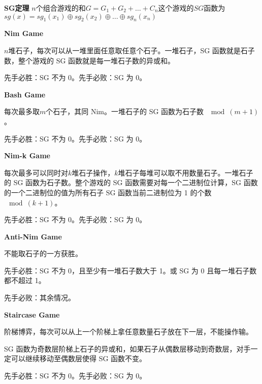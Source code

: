 \textbf{SG定理} $n$个组合游戏的和$G=G_1+G_2+\dots + C_n$这个游戏的$SG$函数为$sg(x) = sg_1(x_1) \oplus sg_2(x_2) \oplus \dots \oplus sg_n(x_n)$

\textbf{Nim Game}

$n$堆石子，每次可以从一堆里面任意取任意个石子。一堆石子，SG 函数就是石子数，整个游戏的 SG 函数就是每一堆石子数的异或和。

先手必胜：SG 不为 0。先手必败：SG 为 0。

\textbf{Bash Game}

每次最多取$m$个石子，其同 Nim。一堆石子的 SG 函数为石子数 $\mod(m + 1)$。

先手必胜：SG 不为 0。先手必败：SG 为 0。

\textbf{Nim-k Game}

每次最多可以同时对$k$堆石子操作，$k$堆石子每堆可以取不用数量石子。一堆石子的 SG 函数为石子数。整个游戏的 SG 函数需要对每一个二进制位计算，SG 函数的一个二进制位的值为所有石子 SG 函数当前二进制位为 1 的个数 $\mod(k + 1)$。

先手必胜：SG 不为 0。先手必败：SG 为 0。

\textbf{Anti-Nim Game}

不能取石子的一方获胜。

先手必胜：SG 不为 0，且至少有一堆石子数大于 1。或 SG 为 0 且每一堆石子数都不超过 1。

先手必败：其余情况。

\textbf{Staircase Game}

阶梯博弈，每次可以从上一个阶梯上拿任意数量石子放在下一层，不能操作输。

SG 函数为奇数层阶梯上石子的异或和，如果石子从偶数层移动到奇数层，对手一定可以继续移动至偶数层使得 SG 函数不变。

先手必胜：SG 不为 0。先手必败：SG 为 0。

